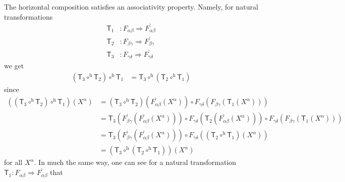 The horizontal composition satisfies an associativity property.
Namely, for natural transformations
\begin{align*}
  \mathsf{T}_{1}
  &\colon
  F_{\alpha\beta}
  \Rightarrow
  F_{\alpha\beta}^{\backprime}
  \\
  \mathsf{T}_{2}
  &\colon
  F_{\beta\gamma}
  \Rightarrow
  F_{\beta\gamma}^{\backprime}
  \\
  \mathsf{T}_{3}
  &\colon
  F_{\gamma\delta}
  \Rightarrow
  F_{\gamma\delta}^{\backprime}
\end{align*}
we get
\begin{align*}
  \left(
    \mathsf{T}_{3}
    \circ^{\textrm{h}}
    \mathsf{T}_{2}
  \right)
  \circ^{\textrm{h}}
  \mathsf{T}_{1}
  &=
  \mathsf{T}_{3}
  \circ^{\textrm{h}}
  \left(
    \mathsf{T}_{2}
    \circ^{\textrm{h}}
    \mathsf{T}_{1}
  \right)
\end{align*}
since
\begin{align*}
  \left(
    \left(
      \mathsf{T}_{3}
      \circ^{\textrm{h}}
      \mathsf{T}_{2}
    \right)
    \circ^{\textrm{h}}
    \mathsf{T}_{1}
  \right)
  (X^{\alpha})
  &=
  \left(
    \mathsf{T}_{3}
    \circ^{\textrm{h}}
    \mathsf{T}_{2}
  \right)
  \left(
    F_{\alpha\beta}^{\backprime}(X^{\alpha})
  \right)
  \circ
  F_{\gamma\delta}
  \left(
    F_{\beta\gamma}
    \left(
      \mathsf{T}_{1}(X^{\alpha})
    \right)
  \right)
  \\
  &=
  \mathsf{T}_{3}
  \left(
    F_{\beta\gamma}^{\backprime}
    \left(
      F_{\alpha\beta}^{\backprime}(X^{\alpha})
    \right)
  \right)
  \circ
  F_{\gamma\delta}
  \left(
    \mathsf{T}_{2}
    \left(
      F_{\alpha\beta}^{\backprime}(X^{\alpha})
    \right)
  \right)
  \circ
  F_{\gamma\delta}
  \left(
    F_{\beta\gamma}
    \left(
      \mathsf{T}_{1}(X^{\alpha})
    \right)
  \right)
  \\
  &=
  \mathsf{T}_{3}
  \left(
    F_{\beta\gamma}^{\backprime}
    \left(
      F_{\alpha\beta}^{\backprime}(X^{\alpha})
    \right)
  \right)
  \circ
  F_{\gamma\delta}
  \left(
    \left(
      \mathsf{T}_{2}
      \circ^{\textrm{h}}
      \mathsf{T}_{1}
    \right)
    (X^{\alpha})
  \right)
  \\
  &=
  \left(
    \mathsf{T}_{3}
    \circ^{\textrm{h}}
    \left(
      \mathsf{T}_{2}
      \circ^{\textrm{h}}
      \mathsf{T}_{1}
    \right)
  \right)
  (X^{\alpha})
\end{align*}
for all $X^{\alpha}$.
In much the same way, one can see for a natural transformation $\mathsf{T}_{1} \colon F_{\alpha\beta} \Rightarrow F_{\alpha\beta}^{\backprime}$ that

